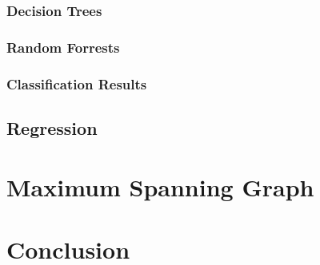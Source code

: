 \documentclass[bsc,frontabs,twoside,singlespacing,parskip,deptreport]{infthesis}     %
\begin{document}
\subsection{Decision Trees}
\subsection{Random Forrests}
\subsection{Classification Results}
\section{Regression}
\chapter{Maximum Spanning Graph}

\chapter{Conclusion}



\end{document}
